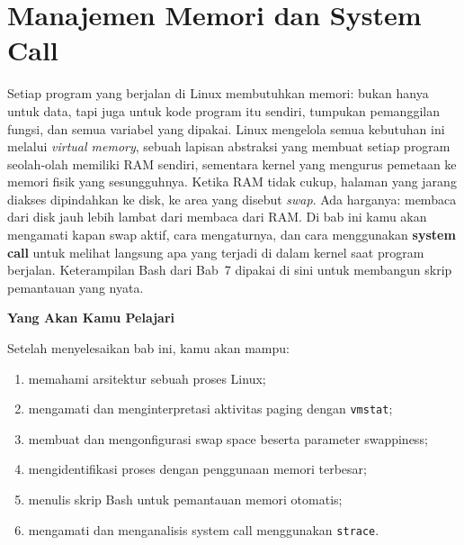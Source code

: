 \chapter{Manajemen Memori dan System Call}
\label{ch:memory-and-syscalls}


Setiap program yang berjalan di Linux membutuhkan memori: bukan hanya untuk data,
tapi juga untuk kode program itu sendiri, tumpukan pemanggilan fungsi, dan semua
variabel yang dipakai. Linux mengelola semua kebutuhan ini melalui \textit{virtual
memory}, sebuah lapisan abstraksi yang membuat setiap program seolah-olah memiliki
RAM sendiri, sementara kernel yang mengurus pemetaan ke memori fisik yang sesungguhnya.
Ketika RAM tidak cukup, halaman yang jarang diakses dipindahkan ke disk, ke area
yang disebut \textit{swap}. Ada harganya: membaca dari disk jauh lebih lambat dari
membaca dari RAM. Di bab ini kamu akan mengamati kapan swap aktif, cara mengaturnya,
dan cara menggunakan \textbf{system call} untuk melihat langsung apa yang terjadi di
dalam kernel saat program berjalan. Keterampilan Bash dari Bab~7 dipakai di sini
untuk membangun skrip pemantauan yang nyata.

\textbf{Yang Akan Kamu Pelajari}

Setelah menyelesaikan bab ini, kamu akan mampu:

\begin{enumerate}
    \item memahami arsitektur  sebuah proses Linux;
    \item mengamati dan menginterpretasi aktivitas paging dengan \texttt{vmstat};
    \item membuat dan mengonfigurasi swap space beserta parameter swappiness;
    \item mengidentifikasi proses dengan penggunaan memori terbesar;
    \item menulis skrip Bash untuk pemantauan memori otomatis;
    \item mengamati dan menganalisis system call menggunakan \texttt{strace}.
\end{enumerate}

